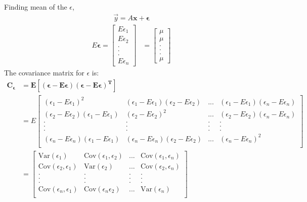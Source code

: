 \documentclass[journal,12pt,onecolumn]{IEEEtran}
\providecommand{\mtx}[1]{\mathbf{#1}}
\theoremstyle{remark}
\begin{document}
Finding mean of the ${\epsilon}$,
\begin{align}
\vec{y}=A\mtx{\boldsymbol{x}}+\mtx{\epsilon}
\end{align}
\begin{align}
\nonumber E\mathbf{{\epsilon}} = \begin{bmatrix}
E{\epsilon}_1 \\%
E{\epsilon}_2 \\%
. \\[-10pt]
. \\[-10pt]
. \\[5pt]
E{\epsilon}_n
\end{bmatrix}&=\begin{bmatrix}
\mu \\%
\mu \\%
. \\[-10pt]
. \\[-10pt]
. \\[5pt]
\mu
\end{bmatrix}
\end{align}
The covariance matrix for ${\epsilon}$ is:
\begin{align}
 \mathbf{C_{\epsilon}}&=\mathbf{E[({\epsilon}-E{\epsilon})({\epsilon}-E{\epsilon})^{T}]} \\
&= E \begin{bmatrix}
({\epsilon}_1-E{\epsilon}_1)^2 & ({\epsilon}_1-E{\epsilon}_1)({\epsilon}_2-E{\epsilon}_2) & ... & ({\epsilon}_1-E{\epsilon}_1)({\epsilon}_n-E{\epsilon}_n) \\
({\epsilon}_2-E{\epsilon}_2)({\epsilon}_1-E{\epsilon}_1) & ({\epsilon}_2-E{\epsilon}_2)^2 & ... & ({\epsilon}_2-E{\epsilon}_2) ({\epsilon}_n-E{\epsilon}_n) \\
. & . & . & .\\
. & . & . & . \\
. & . & . & . \\
({\epsilon}_n-E{\epsilon}_n) ({\epsilon}_1-E{\epsilon}_1) & ({\epsilon}_n-E{\epsilon}_n) ({\epsilon}_2-E{\epsilon}_2) & ... & ({\epsilon}_n-E{\epsilon}_n)^2\\
\end{bmatrix} \\ 
 &= \begin{bmatrix}
\textrm{Var}({\epsilon}_1) & \textrm{Cov}({\epsilon}_1,{\epsilon}_2)& ... & \textrm{Cov}({\epsilon}_1,{\epsilon}_n) \\%
\textrm{Cov}({\epsilon}_2,{\epsilon}_1) & \textrm{Var}({\epsilon}_2) & ... & \textrm{Cov}({\epsilon}_2,{\epsilon}_n) \\%
. & . & . & .\\
. & . & . & . \\
. & . & . & . \\
\textrm{Cov}({\epsilon}_n,{\epsilon}_1) & \textrm{Cov}({\epsilon}_n {\epsilon}_2) & ... & \textrm{Var}({\epsilon}_n)\\
\end{bmatrix}
\end{align}
\end{document}
